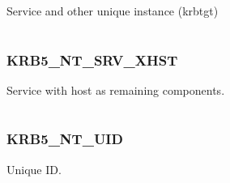 \documentclass[letterpaper,10pt,english]{sphinxmanual}
\begin{document}
\begin{fulllineitems}
\label{appdev/refs/macros/KRB5_NT_SRV_INST:KRB5_NT_SRV_INST}
\end{fulllineitems}


Service and other unique instance (krbtgt)

\begin{tabulary}{\linewidth}{|L|L|}
\hline

 & 
\\\hline
\end{tabulary}



\subsubsection{KRB5\_NT\_SRV\_XHST}
\label{appdev/refs/macros/KRB5_NT_SRV_XHST:krb5-nt-srv-xhst}\label{appdev/refs/macros/KRB5_NT_SRV_XHST:krb5-nt-srv-xhst-data}\label{appdev/refs/macros/KRB5_NT_SRV_XHST::doc}

\begin{fulllineitems}
\label{appdev/refs/macros/KRB5_NT_SRV_XHST:KRB5_NT_SRV_XHST}
\end{fulllineitems}


Service with host as remaining components.

\begin{tabulary}{\linewidth}{|L|L|}
\hline

 & 
\\\hline
\end{tabulary}



\subsubsection{KRB5\_NT\_UID}
\label{appdev/refs/macros/KRB5_NT_UID:krb5-nt-uid}\label{appdev/refs/macros/KRB5_NT_UID:krb5-nt-uid-data}\label{appdev/refs/macros/KRB5_NT_UID::doc}

\begin{fulllineitems}
\label{appdev/refs/macros/KRB5_NT_UID:KRB5_NT_UID}
\end{fulllineitems}


Unique ID.
\end{document}
